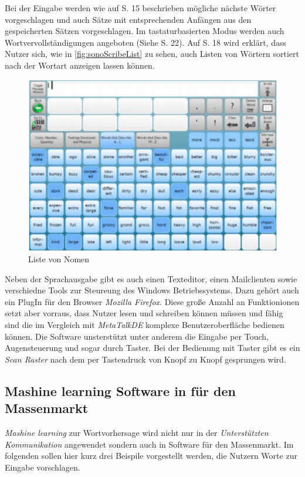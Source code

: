             Bei der Eingabe werden wie auf S. 15 beschrieben mögliche nächste Wörter vorgeschlagen und auch Sätze mit entsprechenden Anfängen aus den gespeicherten Sätzen vorgeschlagen. Im tastaturbasierten Modus werden auch Wortvervollständigungen angeboten (Siehe S. 22). Auf S. 18 wird erklärt, dass Nutzer sich, wie in \autoref{fig:sonoScribeList} zu sehen, auch Listen von Wörtern sortiert nach der Wortart anzeigen lassen können.
            
            \begin{figure}[H]
  				\centering
  				\includegraphics[width=.5\linewidth]{images/SonoScribeList.png}
  				\caption{Liste von Nomen \parencite[S. 18]{tobii:sonoScribeManual}}
                \label{fig:sonoScribeList}
			\end{figure}
            
			Neben der Sprachausgabe gibt es auch einen Texteditor, einen Mailclienten sowie verschiedne Tools zur Steureung des Windows Betriebssystems. Dazu gehört auch ein PlugIn für den Browser \emph{Mozilla Firefox}. Diese große Anzahl an Funktionionen setzt aber vorraus, dass Nutzer lesen und schreiben können müssen und fähig sind die im Vergleich mit \emph{MetaTalkDE} komplexe Benutzeroberfläche bedienen können. Die Software unsterstützt unter anderem die Eingabe per Touch, Augensteuerung und sogar durch Taster. Bei der Bedienung mit Taster gibt es ein \emph{Scan Raster} nach dem per Tastendruck von Knopf zu Knopf gesprungen wird.
    
	\subsection{Mashine learning Software in für den Massenmarkt}
    \emph{Mashine learning} zur Wortvorhersage wird nicht nur in der \emph{Unterstützten Kommunikation} angewendet sondern auch in Software für den Massenmarkt. Im folgenden sollen hier kurz drei Beispile vorgestellt werden, die Nutzern Worte zur Eingabe vorschlagen.
        
